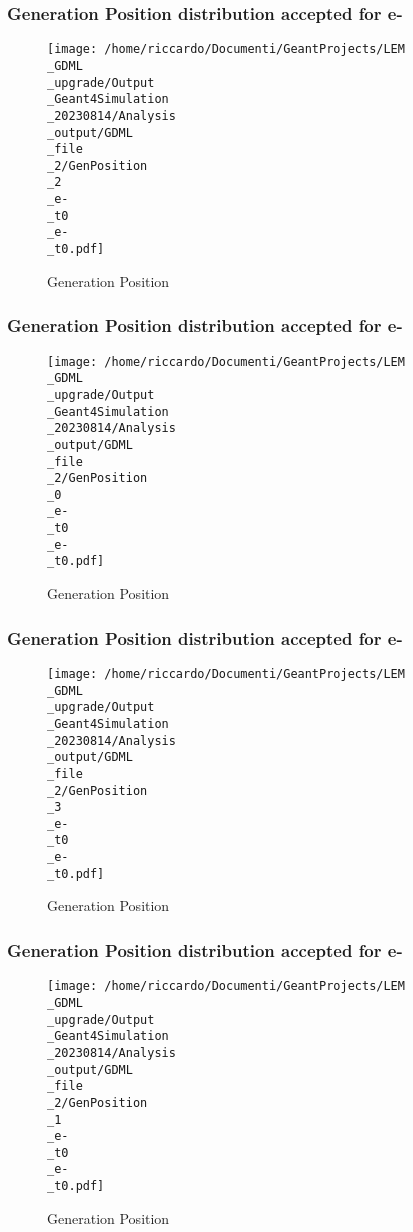 \documentclass[8pt]{beamer}
\begin{document}
            \begin{frame}
                \frametitle{Generation Position distribution accepted for e-}
            
        \begin{figure}[h]
            \centering
            \texttt{[image: /home/riccardo/Documenti/GeantProjects/LEM\\\_GDML\\\_upgrade/Output\\\_Geant4Simulation\\\_20230814/Analysis\\\_output/GDML\\\_file\\\_2/GenPosition\\\_2\\\_e-\\\_t0\\\_e-\\\_t0.pdf]}
            \caption{Generation Position}
        \end{figure}
        
            \end{frame}
            
            \begin{frame}
                \frametitle{Generation Position distribution accepted for e-}
            
        \begin{figure}[h]
            \centering
            \texttt{[image: /home/riccardo/Documenti/GeantProjects/LEM\\\_GDML\\\_upgrade/Output\\\_Geant4Simulation\\\_20230814/Analysis\\\_output/GDML\\\_file\\\_2/GenPosition\\\_0\\\_e-\\\_t0\\\_e-\\\_t0.pdf]}
            \caption{Generation Position}
        \end{figure}
        
            \end{frame}
            
            \begin{frame}
                \frametitle{Generation Position distribution accepted for e-}
            
        \begin{figure}[h]
            \centering
            \texttt{[image: /home/riccardo/Documenti/GeantProjects/LEM\\\_GDML\\\_upgrade/Output\\\_Geant4Simulation\\\_20230814/Analysis\\\_output/GDML\\\_file\\\_2/GenPosition\\\_3\\\_e-\\\_t0\\\_e-\\\_t0.pdf]}
            \caption{Generation Position}
        \end{figure}
        
            \end{frame}
            
            \begin{frame}
                \frametitle{Generation Position distribution accepted for e-}
            
        \begin{figure}[h]
            \centering
            \texttt{[image: /home/riccardo/Documenti/GeantProjects/LEM\\\_GDML\\\_upgrade/Output\\\_Geant4Simulation\\\_20230814/Analysis\\\_output/GDML\\\_file\\\_2/GenPosition\\\_1\\\_e-\\\_t0\\\_e-\\\_t0.pdf]}
            \caption{Generation Position}
        \end{figure}
        
            \end{frame}
            
\end{document}
